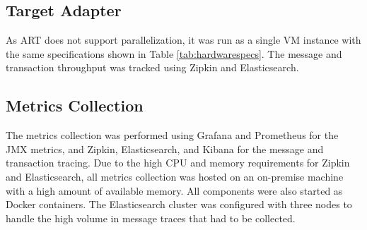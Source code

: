 \subsection{Target Adapter}
As \ac{ART} does not support parallelization, it was run as a single \ac{VM} instance with the same specifications shown in Table \ref{tab:hardwarespecs}. The message and transaction throughput was tracked using Zipkin and Elasticsearch.

\subsection{Metrics Collection}
The metrics collection was performed using Grafana and Prometheus for the \ac{JMX} metrics, and Zipkin, Elasticsearch, and Kibana for the message and transaction tracing. Due to the high \ac{CPU} and memory requirements for Zipkin and Elasticsearch, all metrics collection was hosted on an on-premise machine with a high amount of available memory. All components were also started as Docker containers. The Elasticsearch cluster was configured with three nodes to handle the high volume in message traces that had to be collected.